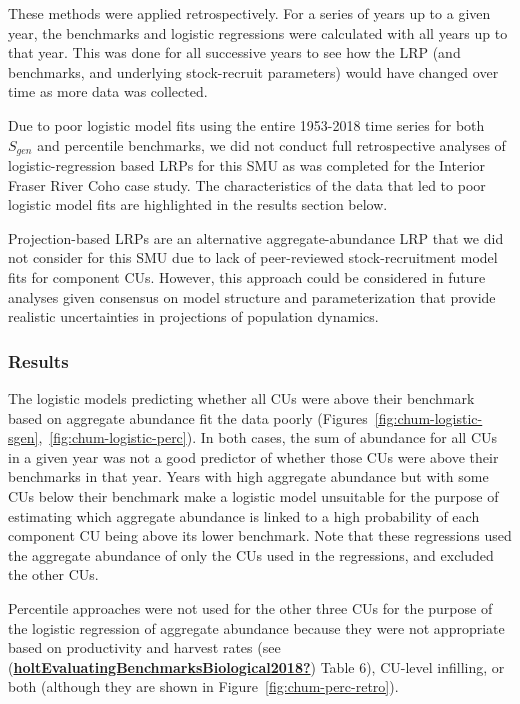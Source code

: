 \documentclass[11pt]{book}
\begin{document}
These methods were applied retrospectively. For a series of years up to a given year, the benchmarks and logistic regressions were calculated with all years up to that year. This was done for all successive years to see how the LRP (and benchmarks, and underlying stock-recruit parameters) would have changed over time as more data was collected.

Due to poor logistic model fits using the entire 1953-2018 time series for both \(S_{gen}\) and percentile benchmarks, we did not conduct full retrospective analyses of logistic-regression based LRPs for this SMU as was completed for the Interior Fraser River Coho case study. The characteristics of the data that led to poor logistic model fits are highlighted in the results section below.

Projection-based LRPs are an alternative aggregate-abundance LRP that we did not consider for this SMU due to lack of peer-reviewed stock-recruitment model fits for component CUs. However, this approach could be considered in future analyses given consensus on model structure and parameterization that provide realistic uncertainties in projections of population dynamics.

\hypertarget{results-4}{%
\subsubsection{Results}\label{results-4}}

The logistic models predicting whether all CUs were above their benchmark based on aggregate abundance fit the data poorly (Figures~\ref{fig:chum-logistic-sgen},~\ref{fig:chum-logistic-perc}). In both cases, the sum of abundance for all CUs in a given year was not a good predictor of whether those CUs were above their benchmarks in that year. Years with high aggregate abundance but with some CUs below their benchmark make a logistic model unsuitable for the purpose of estimating which aggregate abundance is linked to a high probability of each component CU being above its lower benchmark. Note that these regressions used the aggregate abundance of only the CUs used in the regressions, and excluded the other CUs.

Percentile approaches were not used for the other three CUs for the purpose of the logistic regression of aggregate abundance because they were not appropriate based on productivity and harvest rates (see (\protect\hyperlink{ref-holtEvaluatingBenchmarksBiological2018}{\textbf{holtEvaluatingBenchmarksBiological2018?}}) Table 6), CU-level infilling, or both (although they are shown in Figure~\ref{fig:chum-perc-retro}).
\end{document}
